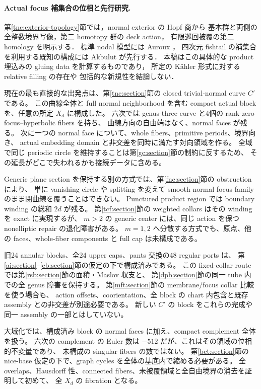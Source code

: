 \documentclass[11pt,a4paper]{article}
\theoremstyle{definition}
\begin{document}
\paragraph{Actual focus 補集合の位相と先行研究.}
第\ref{tnc:exterior-topology}節では，normal exterior の Hopf 商から
基本群と両側の全整数境界写像，第二 homotopy 群の deck action，
有限巡回被覆の第二 homology を明示する．
標準 nodal 模型には Auroux \cite[Section~5.1]{auroux-local}，
四次元 fishtail の補集合を利用する既知の構成には
Akbulut \cite[Introduction]{akbulut-double-fishtail}が先行する．
本稿はこの具体的な product 埋込みの gluing data を計算するものであり，
所定の K\"ahler 形式に対する relative filling の存在や
包括的な新規性を結論しない．

現在の最も直接的な出発点は、第\ref{tnc:section}節の closed trivial-normal curve $C'$ である。
この曲線全体と full normal neighborhood を含む compact actual block を、任意の所定 $X_d$ に構成した。
六次では genus-three curve と4個の rank-zero focus--hyperbolic fibers を持ち、
曲線方向の自由端はなく、normal faces が残る。
次に一つの normal face について、whole fibers、primitive periods、境界向き、
actual embedding domain と非交差を同時に満たす対向領域を作る。
全域で同じ periodic circle を維持することは第\ref{gc:section}節の制約に反するため、
その延長がどこで失われるかも接続データに含める。

Generic plane section を保持する別の方式では、第\ref{fnc:section}節の obstruction により、
単に vanishing circle や splitting を変えて smooth normal focus family のまま閉曲線を覆うことはできない。
Punctured product region では boundary winding の総和 $2d$ が残る。
第\ref{tcf:section}節の weighted collars はその winding を exact に実現するが、
$m>2$ の generic center には、同じ action を保つ nonelliptic repair の退化障害がある。
$m=1,2$ へ分散する方式でも、原点、他の faces、whole-fiber components と full cap は未構成である。

旧24 annular blocks、全24 upper caps、pants 交換の48 regular ports は、
第\ref{ai:section}--\ref{eb:section}節の仮定の下で構成済みである。
この fixed-collar route では第\ref{rsb:section}節の面積・Maslov 収支と、
第\ref{dpb:section}節の同一 tube 内での全 genus 障害を保持する。
第\ref{mft:section}節の membrane/focus collar 比較を使う場合も、
action offsets、coorientation、全 block の chart 内包含と既存 assembly との非交差が別途必要である。
新しい $C'$ の block をこれらの完成や同一 assembly の一部とはしていない。

大域化では、構成済み block の normal faces に加え、compact complement 全体を扱う。
六次の complement の Euler 数は $-512$ だが、これはその領域の位相的不変量であり、
未構成の singular fibers の数ではない。
第\ref{bct:section}節の nice-base 仮定の下で、graph cycles を全体の基底内で縮める必要がある。
全 overlaps、Hausdorff 性、connected fibers、未被覆領域と全自由境界の消去を証明して初めて、
全 $X_d$ の fibration となる。
\end{document}
